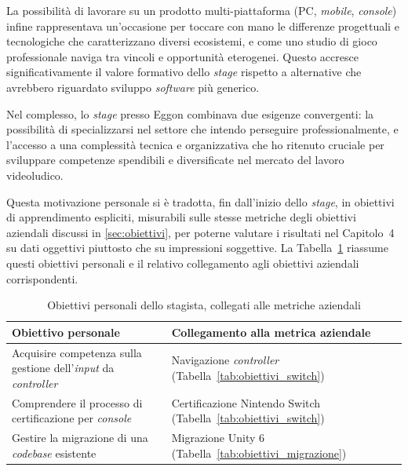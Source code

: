 La possibilità di lavorare su un prodotto multi-piattaforma (PC, \textit{mobile}, \textit{console}) infine rappresentava un'occasione per toccare con mano le differenze progettuali e tecnologiche che caratterizzano diversi ecosistemi, e come uno studio di gioco professionale naviga tra vincoli e opportunità eterogenei. Questo accresce significativamente il valore formativo dello \textit{stage} rispetto a alternative che avrebbero riguardato sviluppo \textit{software} più generico.

Nel complesso, lo \textit{stage} presso Eggon combinava due esigenze convergenti: la possibilità di specializzarsi nel settore che intendo perseguire professionalmente, e l'accesso a una complessità tecnica e organizzativa che ho ritenuto cruciale per sviluppare competenze spendibili e diversificate nel mercato del lavoro videoludico.

Questa motivazione personale si è tradotta, fin dall'inizio dello \textit{stage}, in obiettivi di apprendimento espliciti, misurabili sulle stesse metriche degli obiettivi aziendali discussi in \ref{sec:obiettivi}, per poterne valutare i risultati nel Capitolo~4 su dati oggettivi piuttosto che su impressioni soggettive. La Tabella~\ref{tab:obiettivi_personali} riassume questi obiettivi personali e il relativo collegamento agli obiettivi aziendali corrispondenti.

\begin{table}[h]
\centering
\begin{tabular}{|p{5cm}|p{6cm}|}
\hline
\textbf{Obiettivo personale} & \textbf{Collegamento alla metrica aziendale} \\
\hline
Acquisire competenza sulla gestione dell'\textit{input} da \textit{controller} & Navigazione \textit{controller} (Tabella~\ref{tab:obiettivi_switch}) \\
\hline
Comprendere il processo di certificazione per \textit{console} & Certificazione Nintendo Switch (Tabella~\ref{tab:obiettivi_switch}) \\
\hline
Gestire la migrazione di una \textit{codebase} esistente & Migrazione Unity 6 (Tabella~\ref{tab:obiettivi_migrazione}) \\
\hline
\end{tabular}
\caption{Obiettivi personali dello stagista, collegati alle metriche aziendali}
\label{tab:obiettivi_personali}
\end{table}
